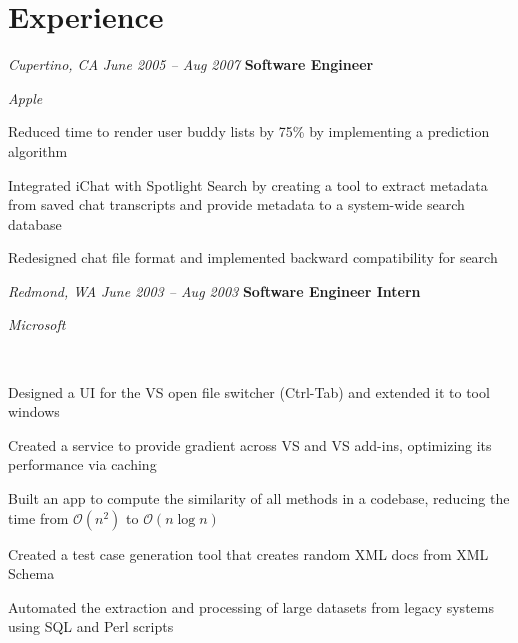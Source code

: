 \section{Experience}

\begin{twocolentry}{
		\textit{Cupertino, CA}
		\textit{June 2005 – Aug 2007}
	}
	\textbf{Software Engineer}

	\textit{Apple}
\end{twocolentry}

\vspace{0.10 cm}
\begin{onecolentry}
	\begin{highlights}
		\item Reduced time to render user buddy lists by 75\% by implementing a prediction algorithm
		\item Integrated iChat with Spotlight Search by creating a tool to extract metadata from saved chat
		transcripts and provide metadata to a system-wide search database
		\item Redesigned chat file format and implemented backward compatibility for search
	\end{highlights}
\end{onecolentry}

\vspace{0.2 cm}

\begin{twocolentry}{
		\textit{Redmond, WA}
		\textit{June 2003 – Aug 2003}
	}
	\textbf{Software Engineer Intern}

	\textit{Microsoft}
\end{twocolentry}

\
\begin{onecolentry}
	\begin{highlights}
		\item Designed a UI for the VS open file switcher (Ctrl-Tab) and extended it to tool windows
		\item Created a service to provide gradient across VS and VS add-ins, optimizing its performance via caching
		\item Built an app to compute the similarity of all methods in a codebase, reducing the time from
		$\mathcal{O}(n^2)$ to $\mathcal{O}(n \log n)$
		\item Created a test case generation tool that creates random XML docs from XML Schema
		\item Automated the extraction and processing of large datasets from legacy systems using SQL and Perl scripts
	\end{highlights}
\end{onecolentry}
